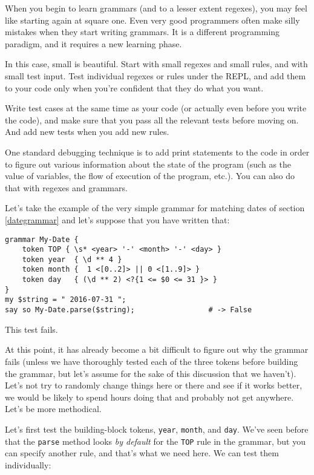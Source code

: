 When you begin to learn grammars (and to a lesser extent regexes), 
you may feel like starting again at square one. Even 
very good programmers often make silly mistakes when they start 
writing grammars. It is a different programming paradigm, and 
it requires a new learning phase.

In this case, small is beautiful. Start with small regexes and 
small rules, and with small test input. Test individual regexes 
or rules under the REPL, and add them to your code only when 
you're confident that they do what you want.

Write test cases at the same time as your code (or actually even 
before you write the code), and make sure that you pass all the 
relevant tests before moving on. And add new tests when you add 
new rules.

One standard debugging technique is to add print statements 
to the code in order to figure out various information about 
the state of the program (such as the value of variables, the 
flow of execution of the program, etc.). You can also do that 
with regexes and grammars.

Let's take the example of the very simple grammar for 
matching dates of section \ref{dategrammar} and let's suppose 
that you have written that:

\begin{verbatim}
grammar My-Date {
    token TOP { \s* <year> '-' <month> '-' <day> }
    token year  { \d ** 4 }                                        
    token month {  1 <[0..2]> || 0 <[1..9]> }                
    token day   { (\d ** 2) <?{1 <= $0 <= 31 }> }  
}                         
my $string = " 2016-07-31 ";
say so My-Date.parse($string);                 # -> False
\end{verbatim}

This test fails.

At this point, it has already become a bit difficult to figure 
out why the grammar fails (unless we have thoroughly tested 
each of the three tokens before building the grammar, but 
let's assume for the sake of this discussion that we haven't).
Let's not try to randomly change things here or there and see 
if it works better, we would be likely to spend hours doing 
that and probably not get anywhere. Let's be more methodical.

Let's first test the building-block tokens, {\tt year}, 
{\tt month}, and {\tt day}. We've seen before that 
the {\tt parse} method looks \emph{by default} for the {\tt TOP} 
rule in the grammar, but you can specify another rule, and 
that's what we need here. We can test them individually:

